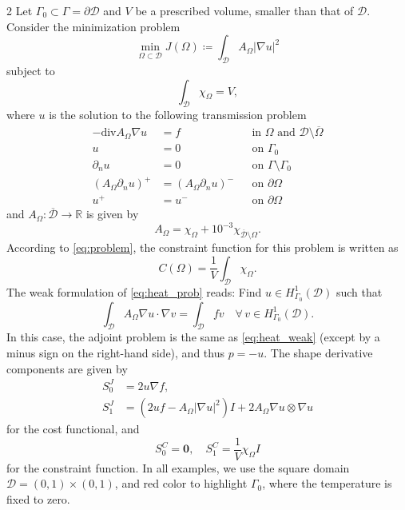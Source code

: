 \documentclass[a4paper, oneside]{article}
\newcommand{\hold}{\mathcal{D}}
\begin{document}
\begin{multicols}{2}
Let $\Gamma_0\subset\Gamma=\partial\hold$ and  $V$ be a prescribed volume, smaller than that of $\mathcal{D}$.
Consider the minimization problem
\begin{equation} \label{eq:heat_cost}
	\min_{\Omega \subset \mathcal{D}}
	J(\Omega) \coloneqq \int_{\mathcal{D}} A_{\Omega}\left|\nabla u\right|^{2}
\end{equation}
subject to
\begin{equation}
	\int_{\mathcal{D}} \chi_{\Omega} = V,
\end{equation}
where $u$ is the solution to the following transmission problem
\begin{equation} \label{eq:heat_prob}
	\begin{aligned}
	-\mathrm{div} A_{\Omega} \nabla u &= f && \text{in } \Omega \text{ and } \mathcal{D}\setminus\overline{\Omega}\\
                                    u &= 0 && \text{on } \Gamma_{0}\\
                       \partial_{n} u &= 0 && \text{on } \Gamma\setminus\Gamma_{0}\\
		(A_{\Omega} \partial_{n} u)^+ &= (A_{\Omega} \partial_{n} u)^- && \text{on }  \partial\Omega\\
							      u^+ &= u^- && \text{on }  \partial\Omega        
	\end{aligned}	
\end{equation}
and $A_{\Omega}:\overline{\mathcal{D}} \rightarrow \mathds{R}$ is given by
\begin{equation}\label{eq:heat_AOmega}
A_{\Omega} = \chi_{\Omega} + {10}^{-3}\chi_{\overline{\mathcal{D}}\setminus\Omega}.
\end{equation}
According to \eqref{eq:problem}, the constraint function for this problem is written as
\begin{equation}
	C(\Omega) = \frac{1}{V} \int_{\mathcal{D}} \chi_{\Omega}.
\end{equation}
The weak formulation of \eqref{eq:heat_prob} reads:
Find $u \in  H^1_{\Gamma_0}(\mathcal{D})$ such that
\begin{equation} \label{eq:heat_weak}
	\int_{\mathcal{D}} A_{\Omega} \nabla u \cdot \nabla v =
	\int_{\mathcal{D}} f v
	\quad
	\forall \, v \in  H^1_{\Gamma_0}(\mathcal{D}).
\end{equation}
In this case, the adjoint problem is the same as \eqref{eq:heat_weak}
(except by a minus sign on the right-hand side), and thus $p=-u$.
The shape derivative components are given by
\begin{align*}
	S^J_0 &= 2u\nabla f, \\
	S^J_1 &= (2uf-A_{\Omega}{|\nabla u|}^{2})I +
				2A_{\Omega}\nabla u\otimes\nabla u
\end{align*}
for the cost functional, and
\begin{equation*}
	S^C_0 = \boldsymbol{0},\quad S^C_1 = \frac{1}{V} \chi_\Omega I
\end{equation*}
for the constraint function.
In all examples, we use the square domain $\mathcal{D} = (0, 1)\times(0, 1)$,
and red color to highlight $\Gamma_0$, where the temperature is fixed to zero.


\end{multicols}
\end{document}
